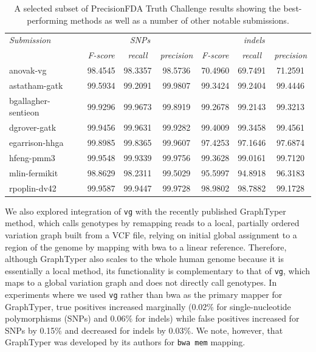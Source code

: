 \documentclass[a4paper,12pt,numbered,oneside]{Classes/PhDThesisPSnPDF}
\begin{document}
\begin{table}[h]
\begin{tabular}{l||ccc|ccc}
\itshape Submission & \multicolumn{3}{c}{\itshape SNPs} & \multicolumn{3}{c}{\itshape indels}\\
& \itshape F-score & \itshape recall & \itshape precision & \itshape F-score & \itshape recall & \itshape precision \\
\hline
anovak-vg & 98.4545 & 98.3357 & 98.5736 & 70.4960 & 69.7491 & 71.2591 \\
astatham-gatk & 99.5934 & 99.2091 & 99.9807 & 99.3424 & 99.2404 & 99.4446 \\
bgallagher-sentieon & 99.9296 & 99.9673 & 99.8919 & 99.2678 & 99.2143 & 99.3213 \\
dgrover-gatk & 99.9456 & 99.9631 & 99.9282 & 99.4009 & 99.3458 & 99.4561 \\
egarrison-hhga & 99.8985 & 99.8365 & 99.9607 & 97.4253 & 97.1646 & 97.6874 \\
hfeng-pmm3 & 99.9548 & 99.9339 & 99.9756 & 99.3628 & 99.0161 & 99.7120 \\
mlin-fermikit & 98.8629 & 98.2311 & 99.5029 & 95.5997 & 94.8918 & 96.3183 \\
rpoplin-dv42 & 99.9587 & 99.9447 & 99.9728 & 98.9802 & 98.7882 & 99.1728 \\
\hline
\end{tabular}
\caption[Selected results from the PrecisionFDA Truth Challenge]{A selected subset of PrecisionFDA Truth Challenge results showing the best-performing methods as well as a number of other notable submissions.}
\label{table:PFDA}
\end{table}

We also explored integration of {\tt vg} with the recently published GraphTyper \cite{eggertsson2017graphtyper} method, which calls genotypes by remapping reads to a local, partially ordered variation graph built from a VCF file, relying on initial global assignment to a region of the genome by mapping with bwa to a linear reference.
Therefore, although GraphTyper also scales to the whole human genome because it is essentially a local method, its functionality is complementary to that of {\tt vg}, which maps to a global variation graph and does not directly call genotypes.
In experiments where we used {\tt vg} rather than bwa as the primary mapper for GraphTyper, true positives increased marginally (0.02\% for single-nucleotide polymorphisms (SNPs) and 0.06\% for indels) while false positives increased for SNPs by 0.15\% and decreased for indels by 0.03\%.
We note, however, that GraphTyper was developed by its authors for {\tt bwa mem} mapping.
\end{document}
